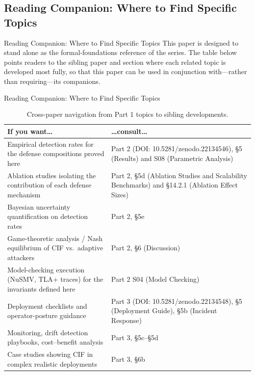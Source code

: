 \documentclass[
  ignorenonframetext,
]{beamer}
\begin{document}
\subsection{Reading Companion: Where to Find Specific
Topics}\label{sec:reading-companion}

\begin{frame}[allowframebreaks]{Reading Companion: Where to Find
Specific Topics}
This paper is designed to stand alone as the formal-foundations
reference of the series. The table below points readers to the sibling
paper and section where each related topic is developed most fully, so
that this paper can be used in conjunction with---rather than
requiring---its companions.

\end{frame}

\begin{frame}[allowframebreaks]{Reading Companion: Where to Find
Specific Topics}
\begin{table}[htbp]
\centering
\caption{Cross-paper navigation from Part 1 topics to sibling developments.}
\label{tab:part1-navigation}
\small
\begin{tabular}{@{}p{}p{}@{}}
\toprule
If you want\ldots & \ldots consult\ldots \\
\midrule
Empirical detection rates for the defense compositions proved here & Part 2 (DOI: 10.5281/zenodo.22134546), \S{5} (Results) and S08 (Parametric Analysis) \\
Ablation studies isolating the contribution of each defense mechanism & Part 2, \S{5d} (Ablation Studies and Scalability Benchmarks) and \S{14.2.1} (Ablation Effect Sizes) \\
Bayesian uncertainty quantification on detection rates & Part 2, \S{5e} \\
Game-theoretic analysis / Nash equilibrium of CIF vs.\ adaptive attackers & Part 2, \S{6} (Discussion) \\
Model-checking execution (NuSMV, TLA+ traces) for the invariants defined here & Part 2 S04 (Model Checking) \\
Deployment checklists and operator-posture guidance & Part 3 (DOI: 10.5281/zenodo.22134548), \S{5} (Deployment Guide), \S{5b} (Incident Response) \\
Monitoring, drift detection playbooks, cost--benefit analysis & Part 3, \S{5c}--\S{5d} \\
Case studies showing CIF in complex realistic deployments & Part 3, \S{6b} \\

\end{tabular}
\end{table}
\end{frame}
\end{document}
